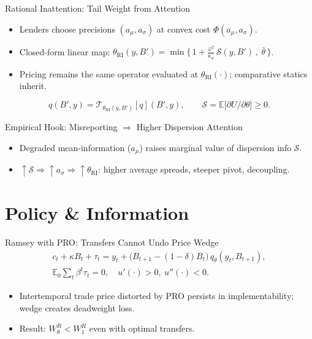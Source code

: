 \documentclass[aspectratio=169,11pt,professionalfonts]{beamer}
\newcommand{\E}{\mathbb{E}}
\newcommand{\1}{\mathbb{1}}
\begin{document}
\begin{frame}{Rational Inattention: Tail Weight from Attention}
  \begin{itemize}
    \item Lenders choose precisions $(a_\mu,a_\sigma)$ at convex cost
          $\Phi(a_\mu,a_\sigma)$.
    \item Closed-form linear map: $\displaystyle
            \theta_{\mathrm{RI}}(y,B')=\min\Big\{\,1+\frac{\varphi^2}{\kappa_\sigma}\,\mathcal
            S(y,B')\,,\;\bar\theta\,\Big\}$.
    \item Pricing remains the same operator evaluated at $\theta_{\mathrm{RI}}(\cdot)$;
          comparative statics inherit.
  \end{itemize}
  \vspace{0.5em}
  \begin{equation*}
    q(B',y)=\mathcal T_{\theta_{\mathrm{RI}}(y,B')}[q](B',y),\qquad \mathcal S=\E\Big[\partial U/\partial\theta\Big]\ge0.
  \end{equation*}
\end{frame}

\begin{frame}{Empirical Hook: Misreporting \texorpdfstring{$\Rightarrow$}{=>} Higher Dispersion Attention}
  \begin{itemize}
    \item Degraded mean-information ($a_\mu$) raises marginal value of dispersion info
          $\mathcal S$.
    \item $\uparrow\mathcal S\Rightarrow \uparrow a_\sigma\Rightarrow \uparrow \theta_{\mathrm{RI}}$: higher average spreads, steeper pivot, decoupling.
  \end{itemize}
\end{frame}

\section{Policy \& Information}

\begin{frame}{Ramsey with PRO: Transfers Cannot Undo Price Wedge}
  \begin{gather*}
    c_t+\kappa B_t+\tau_t = y_t+\big(B_{t+1}-(1{-}\delta)B_t\big)\,q_\theta(y_t,B_{t+1}),\\
    \E_0\sum_t \beta^t\tau_t=0,\quad u'(\cdot)>0,\ u''(\cdot)<0.
  \end{gather*}
  \begin{itemize}
    \item Intertemporal trade price distorted by PRO persists in implementability; wedge
          creates deadweight loss.
    \item Result: $W^R_\theta<W^R_1$ even with optimal transfers.
  \end{itemize}
\end{frame}
\end{document}
